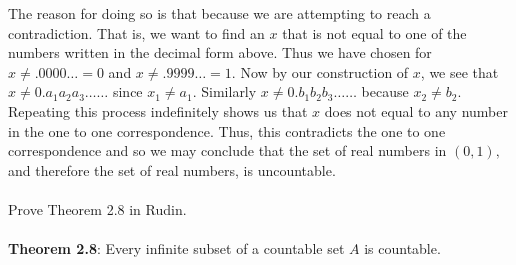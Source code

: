 \documentclass[12pt]{article}
\begin{document}
The reason for doing so is that because we are attempting to reach a contradiction. That is, we want to find an $x$ that is not equal to one of the numbers written in the decimal form above. Thus we have chosen for    $x \neq .0000\ldots = 0$ and $x \neq .9999\ldots=1.$ Now by our construction of $x$, we see that $x \neq 0.a_{1}a_{2}a_{3}\ldots \ldots$ since $x_{1} \neq a_{1}$. Similarly $x \neq 0.b_{1}b_{2}b_{3}\ldots \ldots $ because $x_{2} \neq b_{2}.$ Repeating this process indefinitely shows us that $x$ does not equal to any number in the one to one correspondence. Thus, this contradicts the one to one correspondence and so we may conclude that the set of real numbers in $(0,1),$ and therefore the set of real numbers, is uncountable. \\ \\


\problem Prove Theorem 2.8 in Rudin. \\ \\
\textbf{Theorem 2.8}: Every infinite subset of a countable set $A$ is countable. \\ \\
\end{document}
